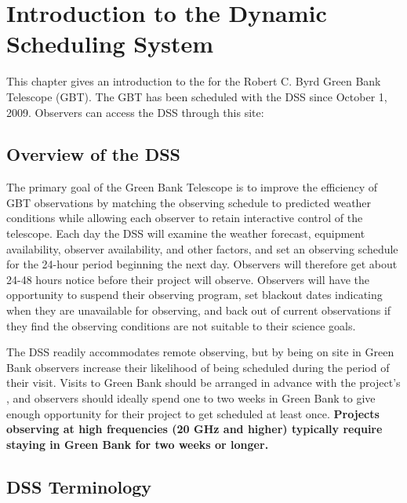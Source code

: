 \chapter{Introduction to the Dynamic Scheduling System}\label{chap:dss}
This chapter gives an introduction to the  for the Robert C.
Byrd Green Bank Telescope (\gls{GBT}). The \gls{GBT} has been scheduled with the
\gls{DSS} since October 1, 2009. Observers can access the \gls{DSS} through this site:

\section{Overview of the DSS}
The primary goal of the Green Bank Telescope  is to improve the
efficiency of \gls{GBT} observations by matching the observing schedule to
predicted weather conditions while allowing each observer to retain interactive
control of the telescope. Each day the \gls{DSS} will examine the weather forecast,
equipment availability, observer availability, and other factors, and set an
observing schedule for the 24-hour period beginning the next day. Observers will
therefore get about 24-48 hours notice before their project will observe.
Observers will have the opportunity to suspend their observing program, set
blackout dates indicating when they are unavailable for observing, and back out of
current observations if they find the observing conditions are not suitable to
their science goals.

The \gls{DSS} readily accommodates remote observing, but by being on site in
Green Bank observers increase their likelihood of being scheduled during the
period of their visit. Visits to Green Bank should be arranged in advance with
the project's , and observers should ideally spend one to two weeks
in Green Bank to give enough opportunity for their project to get scheduled at
least once. {\bf Projects observing at high frequencies (20 GHz and higher)
typically require staying in Green Bank for two weeks or longer.}



\section{DSS Terminology}

